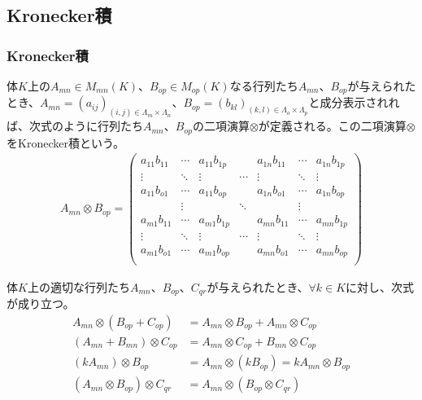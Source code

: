 \documentclass[dvipdfmx]{jsarticle}
\begin{document}
\subsection{Kronecker積}%
\subsubsection{Kronecker積}
\begin{dfn}
体$K$上の$A_{mn} \in M_{mn}(K)$、$B_{op} \in M_{op}(K)$なる行列たち$A_{mn}$、$B_{op}$が与えられたとき、$A_{mn} = \left( a_{ij} \right)_{(i,j) \in \varLambda_{m} \times \varLambda_{n}}$、$B_{op} = \left( b_{kl} \right)_{(k,l) \in \varLambda_{o} \times \varLambda_{p}}$と成分表示されれば、次式のように行列たち$A_{mn}$、$B_{op}$の二項演算$\otimes$が定義される。この二項演算$\otimes$をKronecker積という。
\begin{align*}
A_{mn} \otimes B_{op} = \begin{pmatrix}
a_{11}b_{11} & \cdots & a_{11}b_{1p} & \  & a_{1n}b_{11} & \cdots & a_{1n}b_{1p} \\
 \vdots & \ddots & \vdots & \cdots & \vdots & \ddots & \vdots \\
a_{11}b_{o1} & \cdots & a_{11}b_{op} & \  & a_{1n}b_{o1} & \cdots & a_{1n}b_{op} \\
\  & \vdots & \  & \ddots & \  & \vdots & \  \\
a_{m1}b_{11} & \cdots & a_{m1}b_{1p} & \  & a_{mn}b_{11} & \cdots & a_{mn}b_{1p} \\
 \vdots & \ddots & \vdots & \cdots & \vdots & \ddots & \vdots \\
a_{m1}b_{o1} & \cdots & a_{m1}b_{op} & \  & a_{mn}b_{o1} & \cdots & a_{mn}b_{op} \\
\end{pmatrix}
\end{align*}
\end{dfn}
\begin{thm}\label{2.4.7.1}
体$K$上の適切な行列たち$A_{mn}$、$B_{op}$、$C_{qr}$が与えられたとき、$\forall k \in K$に対し、次式が成り立つ。
\begin{align*}
A_{mn} \otimes \left( B_{op} + C_{op} \right) &= A_{mn} \otimes B_{op} + A_{mn} \otimes C_{op}\\
\left( A_{mn} + B_{mn} \right) \otimes C_{op} &= A_{mn} \otimes C_{op} + B_{mn} \otimes C_{op}\\
\left( kA_{mn} \right) \otimes B_{op} &= A_{mn} \otimes \left( kB_{op} \right) = kA_{mn} \otimes B_{op}\\
\left( A_{mn} \otimes B_{op} \right) \otimes C_{qr} &= A_{mn} \otimes \left( B_{op} \otimes C_{qr} \right)
\end{align*}
\end{thm}
\end{document}
